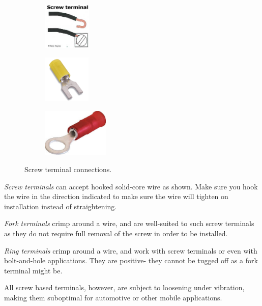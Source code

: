 \begin{figure}[H]
\begin{subfigure}[b]{.24\linewidth}
\includegraphics[height=0.9in]{imgs/connector_solidwire.jpeg}
\end{subfigure}\begin{subfigure}[b]{.24\linewidth}
\includegraphics[height=0.9in]{imgs/connector_fork.jpeg}
\end{subfigure}\begin{subfigure}[b]{.24\linewidth}
\includegraphics[height=0.9in]{imgs/connector_ring.jpeg}
\end{subfigure}
\caption{Screw terminal connections.}
\end{figure}

\begin{asparaenum}[a)]
  \item \textit{Screw terminals} can accept hooked solid-core wire as shown. Make sure you hook the wire in the direction indicated to make sure the wire will tighten on installation instead of straightening.
  \item \textit{Fork terminals} crimp around a wire, and are well-suited to such screw terminals as they do not require full removal of the screw in order to be installed.
  \item \textit{Ring terminals} crimp around a wire, and work with screw terminals or even with bolt-and-hole applications. They are positive- they cannot be tugged off as a fork terminal might be.
\end{asparaenum} 

All screw based terminals, however, are subject to loosening under vibration, making them suboptimal for automotive or other mobile applications.

